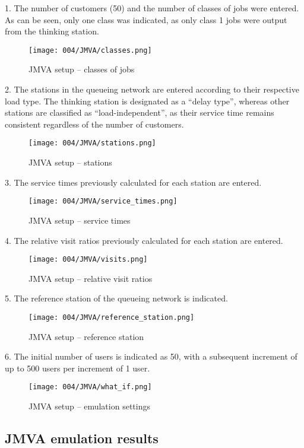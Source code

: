 1.
The number of customers (50) and the number of classes of jobs were entered.
As can be seen, only one class was indicated, as only class 1 jobs were output from the thinking station.
\begin{figure}[h]
	\centering
	\texttt{[image: 004/JMVA/classes.png]}
	\caption{JMVA setup -- classes of jobs}
\end{figure}

2.
The stations in the queueing network are entered according to their respective load type.
The thinking station is designated as a ``delay type'', whereas other stations are classified as ``load-independent'', as their service time remains consistent regardless of the number of customers.
\begin{figure}[h]
	\centering
	\texttt{[image: 004/JMVA/stations.png]}
	\caption{JMVA setup -- stations}
\end{figure}

\clearpage

3.
The service times previously calculated for each station are entered.
\begin{figure}[h]
	\centering
	\texttt{[image: 004/JMVA/service\_times.png]}
	\caption{JMVA setup -- service times}
\end{figure}

4.
The relative visit ratios previously calculated for each station are entered.
\begin{figure}[h]
	\centering
	\texttt{[image: 004/JMVA/visits.png]}
	\caption{JMVA setup -- relative visit ratios}
\end{figure}

\clearpage

5.
The reference station of the queueing network is indicated.
\begin{figure}[h]
	\centering
	\texttt{[image: 004/JMVA/reference\_station.png]}
	\caption{JMVA setup -- reference station}
\end{figure}

6.
The initial number of users is indicated as 50, with a subsequent increment of up to 500 users per increment of 1 user.
\begin{figure}[h]
	\centering
	\texttt{[image: 004/JMVA/what\_if.png]}
	\caption{JMVA setup -- emulation settings}
\end{figure}

\subsection{JMVA emulation results}

